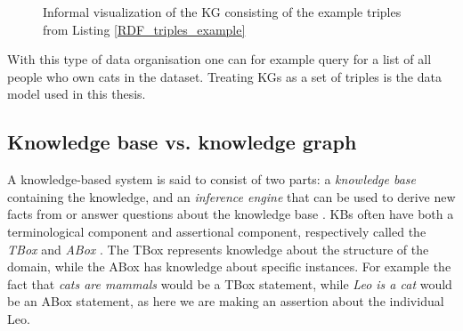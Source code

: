 \begin{figure}[htbp]
\centering
{}

\caption[Visualization of RDF triple example in listing \ref{RDF_triples_example}]{Informal visualization of the KG consisting of the example triples from Listing \ref{RDF_triples_example}} \label{fig:KG_example_2}
\end{figure}

With this type of data organisation one can for example query for a list of all people who own cats in the dataset. Treating KGs as a set of triples is the data model used in this thesis.


\subsection{Knowledge base vs. knowledge graph}
A knowledge-based system is said to consist of two parts: a \textit{knowledge base} containing the knowledge, and an \textit{inference engine} that can be used to derive new facts from or answer questions about the knowledge base \cite{akerkar2009knowledge}. KBs often have both a terminological component and assertional component, respectively called the \textit{TBox} and \textit{ABox} \cite{brachman1989overview}. The TBox represents knowledge about the structure of the domain, while the ABox has knowledge about specific instances. For example the fact that \emph{cats are  mammals} would be a TBox statement, while \emph{Leo is a cat} would be an ABox statement, as here we are making an assertion about the individual Leo.

